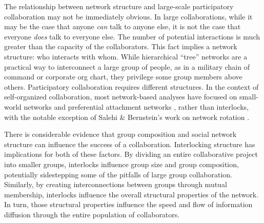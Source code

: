 \documentclass[manuscript,screen,review,acmsmall]{acmart}
\begin{document}
The relationship between network structure and large-scale participatory collaboration may not be immediately obvious.
In large collaborations, while it may be the case that anyone {\em can} talk to anyone else, it is not the case that everyone {\em does} talk to everyone else.
The number of potential interactions is much greater than the capacity of the collaborators.
This fact implies a network structure: who interacts with whom.
While hierarchical ``tree'' networks are a practical way to interconnect a large group of people,
as in a military chain of command or corporate org chart,
they privilege some group members above others.
Participatory collaboration requires different structures.
In the context of self-organized collaboration, most network-based analyses have focused on 
small-world networks \cite{watts_collective_1998}
and preferential attachment networks \cite{barabasi_emergence_1999},
rather than interlocks,
with the notable exception of Salehi \& Bernstein's work on network rotation \cite{salehi_hive:_2018}.

There is considerable evidence that group composition
\cite{hill_group_1982,
nishi_inequality_2015,
robert_jr_differences_2018,
sydow_diversity_2017,
lerner_diverse_2018,
arazy_information_2011}
and social network structure
\cite{
kearns_experiments_2012,
barkoczi_social_2016,
salehi_hive:_2018,
mason_propagation_2008,
mason_collaborative_2012}
can influence the success of a collaboration.
Interlocking structure has implications for both of these factors.
By dividing an entire collaborative project into smaller groups,
interlocks influence group size and group composition,
potentially sidestepping some of the pitfalls of large group collaboration.
Similarly, by creating interconnections between groups through mutual membership,
interlocks influence the overall structural properties of the network.
In turn, those structural properties influence the speed and flow of information diffusion through the entire population of collaborators.
\end{document}
